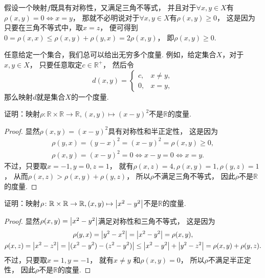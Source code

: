 \begin{remark}
假设一个映射\(f\)既具有对称性，又满足三角不等式，
并且对于\(\forall x,y \in X\)有\(\rho(x,y) = 0 \allowbreak\iff x = y\)，
那就不必明说对于\(\forall x,y \in X\)有\(\rho(x,y) \geq 0\)，
这是因为只要在三角不等式中，取\(x=z\)，
便可得到\(
	0
	= \rho(x,x)
	\leq \rho(x,y) + \rho(y,x)
	= 2 \rho(x,y)
\)，
即\(\rho(x,y)\geq0\).
\end{remark}

\begin{remark}
任意给定一个集合，我们总可以给出无穷多个度量.
例如，给定集合\(X\)，对于\(x,y \in X\)，
只要任意取定\(c\in\mathbb{R}^+\)，
然后令\begin{equation*}
	d(x,y) = \left\{ \begin{array}{cl}
		c, & x \neq y, \\
		0, & x=y,
	\end{array} \right.
\end{equation*}
那么映射\(d\)就是集合\(X\)的一个度量.
\end{remark}

\begin{example}
证明：映射\(
	\rho\colon \mathbb{R}\times\mathbb{R} \to \mathbb{R},
	(x,y) \mapsto (x-y)^2
\)不是\(\mathbb{R}\)的度量.
\begin{proof}
显然\(\rho(x,y) = (x-y)^2\)具有对称性和半正定性，
这是因为\begin{gather*}
	\rho(y,x)
	= (y-x)^2
	= (x-y)^2
	= \rho(x,y)
	\geq 0, \\
	\rho(x,y) = (x-y)^2 = 0 \iff x-y = 0 \iff x=y.
\end{gather*}
不过，只要取\(x=-1,y=0,z=1\)，
就有\(
	\rho(x,z)
	= 4,
	\rho(x,y)
	= 1,
	\rho(y,z)
	= 1
\)，
从而\(\rho(x,z) >\allowbreak \rho(x,y) +\allowbreak \rho(y,z)\)，
所以\(\rho\)不满足三角不等式，
因此\(\rho\)不是\(\mathbb{R}\)的度量.
\end{proof}
\end{example}

\begin{example}
证明：映射\(
	\rho\colon \mathbb{R}\times\mathbb{R} \to \mathbb{R},
	(x,y) \mapsto \abs{x^2-y^2}
\)不是\(\mathbb{R}\)的度量.
\begin{proof}
显然\(\rho(x,y) = \abs{x^2-y^2}\)满足对称性和三角不等式，
这是因为\begin{gather*}
	\rho(y,x)
	= \abs{y^2-x^2}
	= \abs{x^2-y^2}
	= \rho(x,y), \\
	\rho(x,z)
	= \abs{x^2-z^2}
	= \abs{(x^2-y^2)-(z^2-y^2)}
	\leq \abs{x^2-y^2} + \abs{y^2-z^2}
	= \rho(x,y) + \rho(y,z).
\end{gather*}
不过，只要取\(x=1,y=-1\)，
就有\(x \neq y\)
和\(
	\rho(x,y)
	= 0
\)，
所以\(\rho\)不满足半正定性，
因此\(\rho\)不是\(\mathbb{R}\)的度量.
\end{proof}
\end{example}

